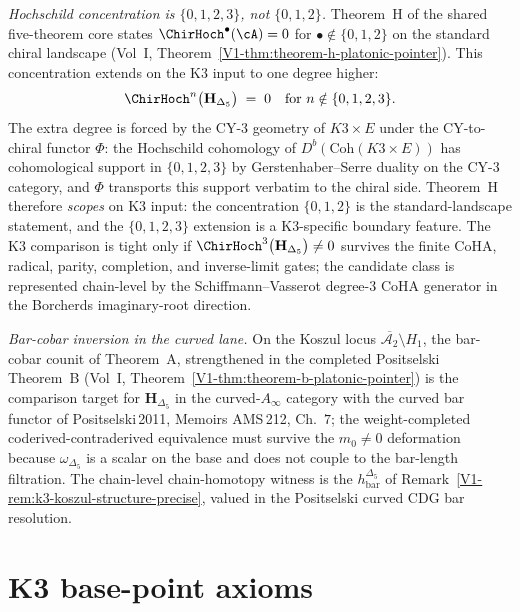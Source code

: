 \begin{remark}
\smallskip
\noindent\emph{Hochschild concentration is $\{0,1,2,3\}$, not
$\{0,1,2\}$.} Theorem~H of the shared five-theorem core states
$\ChirHoch^\bullet(\cA) = 0$ for $\bullet \notin \{0,1,2\}$ on the
standard chiral landscape \textup{(}Vol~I,
Theorem~\textup{\ref{V1-thm:theorem-h-platonic-pointer}}\textup{)}.
This concentration extends on the K3 input to one degree higher:
\[
 \ChirHoch^n\bigl(\mathbf{H}_{\Delta_5}\bigr) \;=\; 0
 \quad \text{for } n \notin \{0,1,2,3\}.
\]
The extra degree is forced by the CY-$3$ geometry of $K3\times E$
under the CY-to-chiral functor $\Phi$: the Hochschild cohomology of
$D^b(\mathrm{Coh}(K3\times E))$ has cohomological support in
$\{0,1,2,3\}$ by Gerstenhaber--Serre duality on the CY-$3$
category, and $\Phi$ transports this support verbatim to the
chiral side. Theorem~H therefore \emph{scopes} on K3 input: the
concentration $\{0,1,2\}$ is the standard-landscape statement, and
the $\{0,1,2,3\}$ extension is a K3-specific boundary feature.
The K3 comparison is tight only if
$\ChirHoch^3\bigl(\mathbf{H}_{\Delta_5}\bigr) \neq 0$ survives the
finite CoHA, radical, parity, completion, and inverse-limit gates; the
candidate class is represented chain-level by the Schiffmann--Vasserot
degree-$3$ CoHA generator in the Borcherds imaginary-root direction.

\smallskip
\noindent\emph{Bar-cobar inversion in the curved lane.}
On the Koszul locus $\overline{\mathcal{A}_2}\setminus H_1$, the
bar-cobar counit of Theorem~A, strengthened in the completed
Positselski Theorem~B \textup{(}Vol~I,
Theorem~\textup{\ref{V1-thm:theorem-b-platonic-pointer}}\textup{)}
is the comparison target for $\mathbf{H}_{\Delta_5}$ in the
curved-$A_\infty$ category with the curved bar functor of
Positselski\,2011, Memoirs AMS\,212, Ch.~$7$; the
weight-completed coderived-contraderived equivalence must survive the
$m_0\ne 0$ deformation because
$\omega_{\Delta_5}$ is a scalar on the base and does not couple to
the bar-length filtration. The chain-level chain-homotopy witness
is the $h_{\mathrm{bar}}^{\Delta_5}$ of
Remark~\textup{\ref{V1-rem:k3-koszul-structure-precise}}, valued in the
Positselski curved CDG bar resolution.
\end{remark}

\section{K3 base-point axioms}
\label{sec:axioms-supplement}

